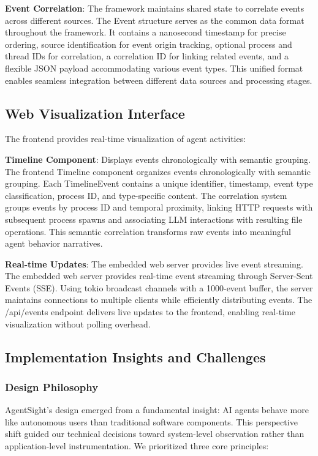\documentclass[sigplan,screen，review,9pt]{acmart}
\begin{document}
\textbf{Event Correlation}: The framework maintains shared state to correlate events across different sources. The Event structure serves as the common data format throughout the framework. It contains a nanosecond timestamp for precise ordering, source identification for event origin tracking, optional process and thread IDs for correlation, a correlation ID for linking related events, and a flexible JSON payload accommodating various event types. This unified format enables seamless integration between different data sources and processing stages.

\subsection{Web Visualization Interface}

The frontend provides real-time visualization of agent activities:

\textbf{Timeline Component}: Displays events chronologically with semantic grouping. The frontend Timeline component organizes events chronologically with semantic grouping. Each TimelineEvent contains a unique identifier, timestamp, event type classification, process ID, and type-specific content. The correlation system groups events by process ID and temporal proximity, linking HTTP requests with subsequent process spawns and associating LLM interactions with resulting file operations. This semantic correlation transforms raw events into meaningful agent behavior narratives.

\textbf{Real-time Updates}: The embedded web server provides live event streaming. The embedded web server provides real-time event streaming through Server-Sent Events (SSE). Using tokio broadcast channels with a 1000-event buffer, the server maintains connections to multiple clients while efficiently distributing events. The /api/events endpoint delivers live updates to the frontend, enabling real-time visualization without polling overhead.

\subsection{Implementation Insights and Challenges}

\subsubsection{Design Philosophy}

AgentSight's design emerged from a fundamental insight: AI agents behave more like autonomous users than traditional software components. This perspective shift guided our technical decisions toward system-level observation rather than application-level instrumentation. We prioritized three core principles:
\end{document}
